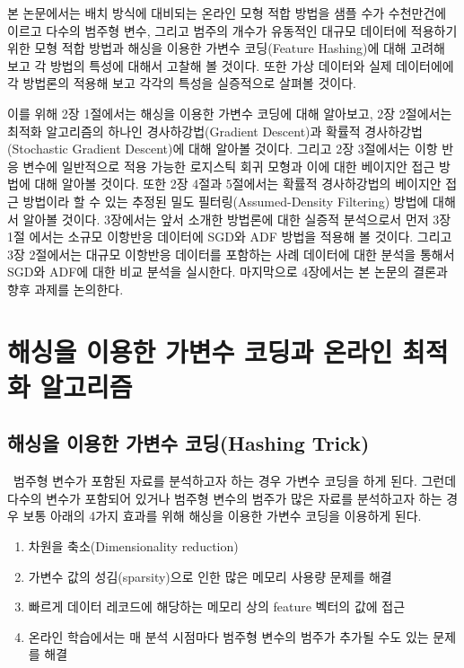 \documentclass[oneside,b5paper,11pt]{book}
\theoremstyle{plain}
\theoremstyle{definition}
\theoremstyle{remark}
\theoremstyle{definition}
\numberwithin{equation}{chapter}
\begin{document}
본 논문에서는 배치 방식에 대비되는 온라인 모형 적합 방법을 샘플 수가 수천만건에 이르고 다수의 범주형 변수, 그리고 범주의 개수가 유동적인 대규모 데이터에 적용하기 위한 모형 적합 방법과 해싱을 이용한 가변수 코딩(Feature Hashing)에 대해 고려해 보고 각 방법의 특성에 대해서 고찰해 볼 것이다. 또한 가상 데이터와 실제 데이터에에 각 방법론의 적용해 보고 각각의 특성을 실증적으로 살펴볼 것이다.

 이를 위해 2장 1절에서는 해싱을 이용한 가변수 코딩에 대해 알아보고, 2장 2절에서는 최적화 알고리즘의 하나인 경사하강법(Gradient Descent)과 확률적 경사하강법(Stochastic Gradient Descent)에 대해 알아볼 것이다. 그리고 2장 3절에서는 이항 반응 변수에 일반적으로 적용 가능한 로지스틱 회귀 모형과 이에 대한 베이지안 접근 방법에 대해 알아볼 것이다. 또한 2장 4절과 5절에서는 확률적 경사하강법의 베이지안 접근 방법이라 할 수 있는 추정된 밀도 필터링(Assumed-Density Filtering) 방법에 대해서 알아볼 것이다. 3장에서는 앞서 소개한 방법론에 대한 실증적 분석으로서 먼저 3장 1절 에서는 소규모 이항반응 데이터에 SGD와 ADF 방법을 적용해 볼 것이다. 그리고 3장 2절에서는 대규모 이항반응 데이터를 포함하는 사례 데이터에 대한 분석을 통해서 SGD와 ADF에 대한 비교 분석을 실시한다. 마지막으로 4장에서는 본 논문의 결론과 향후 과제를 논의한다.

\newpage %





%
%
\chapter{해싱을 이용한 가변수 코딩과 온라인 최적화 알고리즘}

\section{해싱을 이용한 가변수 코딩(Hashing Trick)}
{}\
 범주형 변수가 포함된 자료를 분석하고자 하는 경우 가변수 코딩을 하게 된다. 그런데  다수의 변수가 포함되어 있거나 범주형 변수의 범주가 많은 자료를 분석하고자 하는 경우 보통 아래의 4가지 효과를 위해 해싱을 이용한 가변수 코딩을 이용하게 된다.
\begin{enumerate}
\item 차원을 축소(Dimensionality reduction)
\item 가변수 값의 성김(sparsity)으로 인한 많은 메모리 사용량 문제를 해결
\item 빠르게 데이터 레코드에 해당하는 메모리 상의 feature 벡터의 값에 접근
\item 온라인 학습에서는 매 분석 시점마다 범주형 변수의 범주가 추가될 수도 있는 문제를 해결
\end{enumerate}
\end{document}
